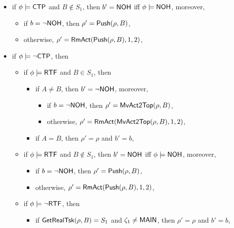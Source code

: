 {\begin{itemize}
\begin{itemize}
\begin{itemize}
\begin{itemize}
\begin{itemize}
\begin{itemize}
					\begin{itemize}
						\item if $\phi \models \neg \stpflag$, then $\rho' = \clrtop(\rho, B)$ and $b' = \nohflag$ iff $\phi \models \nohflag$, 
						\item otherwise, $\rho' = \rho$ and $b' = b$,
					\end{itemize}
				\end{itemize}
				\item if $\phi \models {\sf CTP}$ and $B\notin S_1$, then $b' = \nohflag$ iff $\phi \models \nohflag$, moreover,
				\begin{itemize}
					\item if $b = \neg {\sf NOH}$, then $\rho'=\mathsf{Push}(\rho, B)$,
					\item otherwise, $\rho' = \mathsf{RmAct}(\mathsf{Push}(\rho, B), 1, 2)$, 
				\end{itemize}
				\item if $\phi \models \neg {\sf CTP}$, then
				\begin{itemize}
					\item if $\phi \models {\sf RTF}$ and $B \in S_1$, then
					\begin{itemize}
                					\item if $A \neq B$, then $b' = \neg {\sf NOH}$, moreover, 
                					\begin{itemize}
                						\item if $b = \neg {\sf NOH}$, then $\rho'=\mathsf{MvAct2Top}(\rho, B)$,
							\item otherwise, $\rho' = \mathsf{RmAct}(\mathsf{MvAct2Top}(\rho, B), 1, 2)$,
						\end{itemize}
                					\item if $A = B$, then $\rho' = \rho$ and $b' = b$, 
                				\end{itemize}
					\item if $\phi \models {\sf RTF}$ and $B \notin S_1$, then $b' = \nohflag$ iff $\phi \models \nohflag$, moreover,
					\begin{itemize}
						\item if $b = \neg {\sf NOH}$, then $\rho'=\mathsf{Push}(\rho, B)$,
						\item otherwise, $\rho' = \mathsf{RmAct}(\mathsf{Push}(\rho, B), 1, 2)$, 
					\end{itemize}
					\item if $\phi \models \neg {\sf RTF}$, then
					\begin{itemize}
						\item if $\mathsf{GetRealTsk}(\rho,B) = S_1$ and $\zeta_1 \neq {\sf MAIN}$, then $\rho' = \rho$ and $b' = b$,

\end{itemize}
\end{itemize}
\end{itemize}
\end{itemize}
\end{itemize}
\end{itemize}
\end{itemize}}
